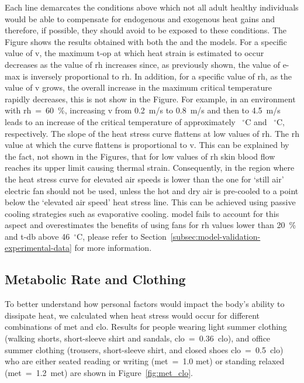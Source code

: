 Each line demarcates the conditions above which not all adult healthy individuals would be able to compensate for endogenous and exogenous heat gains and therefore, if possible, they should avoid to be exposed to these conditions.
The Figure shows the results obtained with both the  and the  models.
For a specific value of \ac{v}, the maximum \ac{t-op} at which heat strain is estimated to occur decreases as the value of \ac{rh} increases since, as previously shown, the value of \ac{e-max} is inversely proportional to \ac{rh}.
In addition, for a specific value of \ac{rh}, as the value of \ac{v} grows, the overall increase in the maximum critical temperature rapidly decreases, this is not show in the Figure.
For example, in an environment with \ac{rh}~=~60~\%, increasing \ac{v} from 0.2~m/s to 0.8~m/s and then to 4.5~m/s leads to an increase of the critical temperature of approximately ~$^{\circ}$C and ~$^{\circ}$C, respectively.
The slope of the heat stress curve flattens at low values of \ac{rh}.
The \ac{rh} value at which the curve flattens is proportional to \ac{v}.
This can be explained by the fact, not shown in the Figures, that for low values of \ac{rh} skin blood flow reaches its upper limit causing thermal strain.
Consequently, in the region where the heat stress curve for elevated air speeds is lower than the one for `still air' electric fan should not be used, unless the hot and dry air is pre-cooled to a point below the `elevated air speed' heat stress line.
This can be achieved using passive cooling strategies such as evaporative cooling.
 model fails to account for this aspect and overestimates the benefits of using fans for \ac{rh} values lower than 20~\% and \ac{t-db} above 46~$^{\circ}$C, please refer to Section~\ref{subsec:model-validation-experimental-data} for more information.

\subsection{Metabolic Rate and Clothing}\label{subsec:met-clo}

To better understand how personal factors would impact the body's ability to dissipate heat, we calculated when heat stress would occur for different combinations of \ac{met} and \ac{clo}.
Results for people wearing light summer clothing (walking shorts, short-sleeve shirt and sandals, \acs{clo}~=~0.36~clo), and office summer clothing (trousers, short-sleeve shirt, and closed shoes \acs{clo}~=~0.5~clo) who are either seated reading or writing (\ac{met}~=~1.0 met) or standing relaxed (\ac{met}~=~1.2~met) are shown in Figure~\ref{fig:met_clo}.

